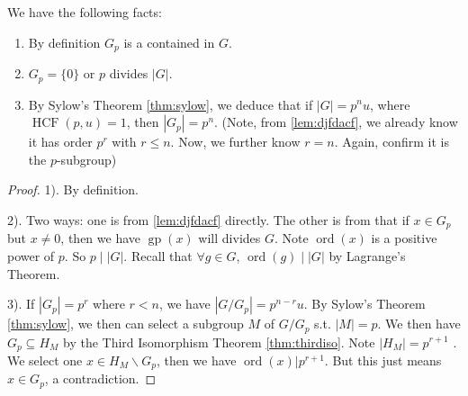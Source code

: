 \documentclass{article}
\newcommand{\gp}{\operatorname{gp}}
\newcommand{\ord}{\operatorname{ord}}
\newcommand{\HCF}{\operatorname{HCF}}
\begin{document}
\begin{lema}We have the following facts:
 \begin{enumerate}
    \item By definition $G_{p}$ is a  contained in $G$.
     \item  $G_{p}=\{0\}$ or $p$ divides $|G|$. 
     \item By Sylow's Theorem \cref{thm:sylow}, we deduce that if $|G|=p^{n} u$, where $\HCF(p, u)=1$, then $\left|G_{p}\right|=p^{n}$. (Note, from \cref{lem:djfdacf}, we already know it has order $p^r$ with $r\le n$. Now, we further know $r=n$. Again, confirm it is the   $p$-subgroup)
 \end{enumerate}
\end{lema}  
\begin{proof}
1). By definition.

2). Two ways: one is from \cref{lem:djfdacf} directly. The other is from that if $x\in G_p$ but $x\ne 0$, then we have $\gp(x)$ will divides  $G$. Note $\ord(x)$ is a positive power of $p$. So $p\mid |G|$. Recall that $\forall g \in G$, $\operatorname{ord}(g)\mid | G |$ by Lagrange's Theorem. 

3). If  $|G_p|=p^{r}$ where $r<n$, we have $|G/G_p|=p^{n-r}u$. By Sylow's Theorem \cref{thm:sylow}, we then can select a subgroup $M$ of $G/G_p$ s.t. $|M|=p$.  We then have $G_p\subseteq H_M$ by the Third Isomorphism Theorem \cref{thm:thirdiso}. Note $|H_M|=p^{r+1}$ . We select one $x\in H_M\backslash G_p$, then we have $\ord(x)|p^{r+1}$. But this just means $x\in G_p$, a contradiction.
\end{proof}
\end{document}
